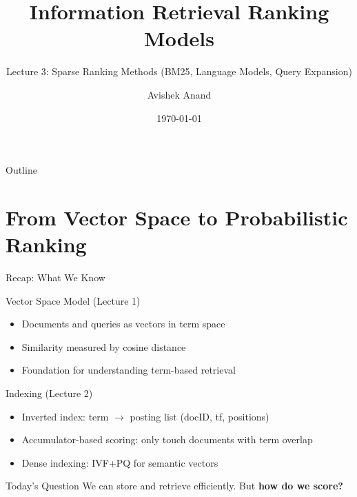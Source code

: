 \documentclass[aspectratio=169]{beamer}
\title[Ranking Models]{Information Retrieval Ranking Models}
\subtitle{Lecture 3: Sparse Ranking Methods (BM25, Language Models, Query Expansion)}
\author{Avishek Anand}
\institute{Information Retrieval}
\date{\today}
\begin{document}
\begin{frame}
\titlepage
\end{frame}

\begin{frame}{Outline}
\tableofcontents
\end{frame}

\section{From Vector Space to Probabilistic Ranking}

\begin{frame}[plain]
\sectionpage
\end{frame}

\begin{frame}{Recap: What We Know}
\begin{block}{Vector Space Model (Lecture 1)}
\begin{itemize}
    \item Documents and queries as vectors in term space
    \item Similarity measured by cosine distance
    \item Foundation for understanding term-based retrieval
\end{itemize}
\end{block}

\begin{block}{Indexing (Lecture 2)}
\begin{itemize}
    \item Inverted index: term $\to$ posting list (docID, tf, positions)
    \item Accumulator-based scoring: only touch documents with term overlap
    \item Dense indexing: IVF+PQ for semantic vectors
\end{itemize}
\end{block}

\begin{alertblock}{Today's Question}
We can store and retrieve efficiently. But \textbf{how do we score?}
\end{alertblock}
\end{frame}
\end{document}
